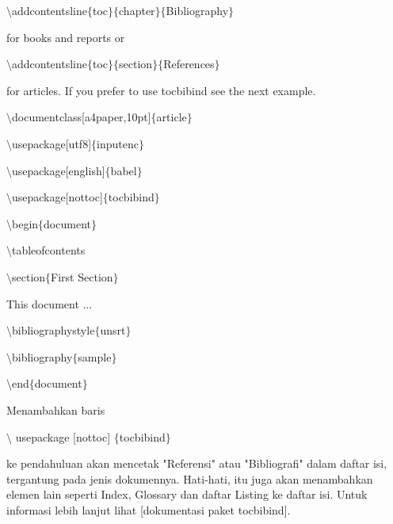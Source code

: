 \begin{itemize}
$\setminus$addcontentsline$ \{ $toc$ \} $$ \{ $chapter$ \} $$ \{ $Bibliography$ \} $\par
\vspace{\baselineskip}
for books and reports or\par

$\setminus$addcontentsline$ \{ $toc$ \} $$ \{ $section$ \} $$ \{ $References$ \} $\par
\vspace{\baselineskip}
for articles. If you prefer to use tocbibind see the next example.\par

$\setminus$documentclass[a4paper,10pt]$ \{ $article$ \} $\par

$\setminus$usepackage[utf8]$ \{ $inputenc$ \} $\par

$\setminus$usepackage[english]$ \{ $babel$ \} $\par

$\setminus$usepackage[nottoc]$ \{ $tocbibind$ \} $\par

$\setminus$begin$ \{ $document$ \} $\par

$\setminus$tableofcontents\par

$\setminus$section$ \{ $First Section$ \} $\par

\vspace{\baselineskip}
This document ...\par

$\setminus$bibliographystyle$ \{ $unsrt$ \} $\par

$\setminus$bibliography$ \{ $sample$ \} $\par

$\setminus$end$ \{ $document$ \} $\par
\vspace{\baselineskip}
Menambahkan baris\par
\vspace{\baselineskip}
$\setminus$ usepackage [nottoc] $ \{ $tocbibind$ \} $\par
\vspace{\baselineskip}
ke pendahuluan akan mencetak "Referensi" atau "Bibliografi" dalam daftar isi, tergantung pada jenis dokumennya. Hati-hati, itu juga akan menambahkan elemen lain seperti Index, Glossary dan daftar Listing ke daftar isi. Untuk informasi lebih lanjut lihat [dokumentasi paket tocbibind].\par


\end{itemize}
